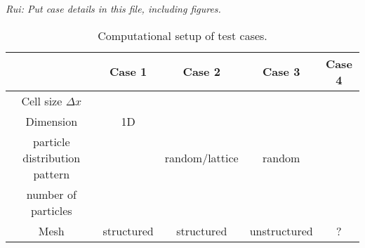 \begin{center}
\emph{\color{red} Rui: Put case details in this file, including figures.}
\end{center}


\begin{table}[htdp]
\caption{Computational setup of test cases.}
\begin{center}
\begin{tabular}{|c|c|c|c|c|}
\hline
	{}		      		&  Case 1  		&	Case 2 	& 	Case 3 	&   Case 4 	\\
\hline
Cell size $\Delta x$  		& 			&			&			&     		\\
Dimension 				& 	1D		&			& 			&		\\
particle distribution pattern	&   			&  random/lattice  &    random 	&		\\
number of particles 		&			&			&			&  		\\
Mesh  				& structured 	& structured 	& unstructured  	& ? 		\\
\hline
\end{tabular}
\end{center}
\label{tab:cases}
\end{table}%
